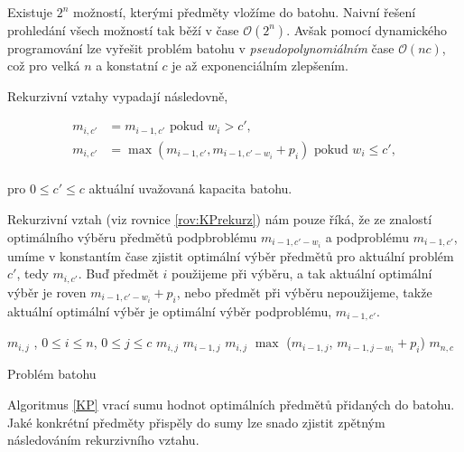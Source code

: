 Existuje $2^n$ možností, kterými předměty vložíme do batohu. Naivní řešení prohledání všech možností tak běží v čase $\mathcal{O} (2^n)$.
Avšak pomocí dynamického programování lze vyřešit problém batohu v \textit{pseudopolynomiálním} čase $\mathcal{O}(nc)$,
což pro velká $n$ a konstatní $c$ je až exponenciálním zlepšením.

Rekurzivní vztahy vypadají následovně,

\begin{definice}\label{rov:KPrekurz}
  \begin{align}
    m_{i, c'} &= m_{i - 1, c'} \text{ pokud } w_i > c', \\
    m_{i, c'} &= \max (m_{i - 1, c'}, m_{i - 1, c' - w_i} + p_i) \text{ pokud } w_i \leq c',
  \end{align}
  \\
  pro $0 \leq c' \leq c$ aktuální uvažovaná kapacita batohu.
\end{definice}

Rekurzivní vztah (viz rovnice \ref{rov:KPrekurz}) nám pouze říká, že ze znalostí optimálního výběru předmětů podpbroblému $m_{i-1, c' - w_i}$ a podproblému $m_{i - 1, c'}$,
umíme v konstantím čase zjistit optimální výběr předmětů pro aktuální problém $c'$, tedy $m_{i, c'}$.
Buď předmět $i$ použijeme při výběru, a tak aktuální optimální výběr je roven $m_{i - 1, c' - w_i} + p_i$,
nebo předmět při výběru nepoužijeme, takže aktuální optimální výběr je optimální výběr podproblému, $m_{i - 1, c'}$. 

\begin{algorithm}[h]
  \begin{algorithmic}[1]
    \State $m_{i, j}$ , $0 \leq i \leq n$, $0 \leq j \leq c$
          \State $m_{i, j}$ \gets $m_{i - 1, j}$
        \Else
          \State $m_{i, j}$ \gets $\max$ ($m_{i - 1, j}$, $m_{i - 1, j - w_i} + p_i$)
        \EndIf
      \EndFor
    \EndFor
    \State \Return $m_{n,c}$
  \EndFunction
  \end{algorithmic}
  \caption{Problém batohu}
  \label{KP}
\end{algorithm}

Algoritmus \ref{KP} vrací sumu hodnot optimálních předmětů přidaných do batohu.
Jaké konkrétní předměty přispěly do sumy lze snado zjistit zpětným následováním rekurzivního vztahu.

